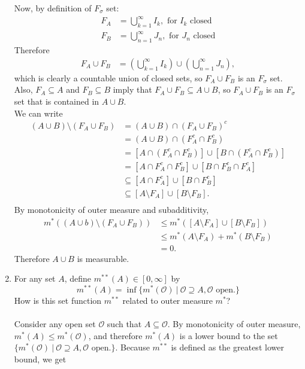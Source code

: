\begin{enumerate}
	Now, by definition of $F_\sigma$ set:
	\begin{align*}
		F_A &= \bigcup_{k=1}^\infty I_k,\text{ for }I_k\text{ closed}\\
		F_B &= \bigcup_{n=1}^\infty J_n,\text{ for }J_n\text{ closed}
	\end{align*}
	Therefore 
	\begin{align*}
		F_A\cup F_B&=(\bigcup_{k=1}^\infty I_k)\cup(\bigcup_{n=1}^\infty J_n),
	\end{align*}
	which is clearly a countable union of closed sets, so $F_A\cup F_B$ is an $F_\sigma$ set.
	Also, $F_A\subseteq A$ and $F_B\subseteq B$ imply that $F_A\cup F_B\subseteq A\cup B$, so $F_A\cup F_B$ is an $F_\sigma$ set that is contained in $A\cup B$.\\
	We can write
	\begin{align*}
		(A\cup B)\setminus(F_A\cup F_B)&=(A\cup B)\cap(F_A\cup F_B)^c\\
		&=(A\cup B)\cap(F_A^c\cap F_B^c)\\
		&=[A\cap(F_A^c\cap F_B^c)]\cup[B\cap(F_A^c\cap F_B^c)]\\
		&=[A\cap F_A^c\cap F_B^c]\cup[B\cap F_B^c\cap F_A^c]\\
		&\subseteq[A\cap F_A^c]\cup[B\cap F_B^c]\\
		&\subseteq[A\setminus F_A]\cup[B\setminus F_B].\\
	\end{align*}
	By monotonicity of outer measure and subadditivity, 
	\begin{align*}
		m^*((A\cup b)\setminus(F_A\cup F_B))&\le m^*([A\setminus F_A]\cup[B\setminus F_B])\\
		&\le m^*(A\setminus F_A)+m^*(B\setminus F_B)\\
		&=0.
	\end{align*}
	Therefore $A\cup B$ is measurable.\\
	\item For any set $A$, define $m^{**}(A)\in[0,\infty]$ by 
	\[
		m^{**}(A)=\inf\{m^*(\mathcal{O})\ |\ \mathcal{O}\supseteq A, \mathcal{O}\text{ open.}\}	
	\]
	How is this set function $m^{**}$ related to outer measure $m^*$?\\
	\\Consider any open set $\mathcal{O}$ such that $A\subseteq\mathcal{O}$.
	By monotonicity of outer measure, $m^*(A)\le m^*(\mathcal{O})$, and therefore $m^*(A)$ is a lower bound to the set $\{m^*(\mathcal{O})\ |\ \mathcal{O}\supseteq A, \mathcal{O}\text{ open.}\}$.
	Because $m^{**}$ is defined as the greatest lower bound, we get

\end{enumerate}
